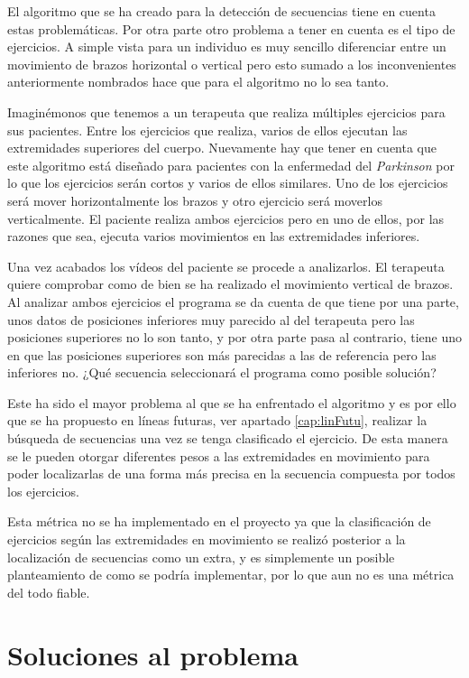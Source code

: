El algoritmo que se ha creado para la detección de secuencias tiene en cuenta estas problemáticas. Por otra parte otro problema a tener en cuenta es el tipo de ejercicios. A simple vista para un individuo es muy sencillo diferenciar entre un movimiento de brazos horizontal o vertical pero esto sumado a los inconvenientes anteriormente nombrados hace que para el algoritmo no lo sea tanto. 

Imaginémonos que tenemos a un terapeuta que realiza múltiples ejercicios para sus pacientes. Entre los ejercicios que realiza, varios de ellos ejecutan las extremidades superiores del cuerpo. Nuevamente hay que tener en cuenta que este algoritmo está diseñado para pacientes con la enfermedad del \textit{Parkinson} por lo que los ejercicios serán cortos y varios de ellos similares. Uno de los ejercicios será mover horizontalmente los brazos y otro ejercicio será moverlos verticalmente. El paciente realiza ambos ejercicios pero en uno de ellos, por las razones que sea, ejecuta varios movimientos en las extremidades inferiores.

Una vez acabados los vídeos del paciente se procede a analizarlos. El terapeuta quiere comprobar como de bien se ha realizado el movimiento vertical de brazos. Al analizar ambos ejercicios el programa se da cuenta de que tiene por una parte, unos datos de posiciones inferiores muy parecido al del terapeuta pero las posiciones superiores no lo son tanto, y por otra parte pasa al contrario, tiene uno en que las posiciones superiores son más parecidas a las de referencia pero las inferiores no. ¿Qué secuencia seleccionará el programa como posible solución?

Este ha sido el mayor problema al que se ha enfrentado el algoritmo y es por ello que se ha propuesto en líneas futuras, ver apartado \ref{cap:linFutu}, realizar la búsqueda de secuencias una vez se tenga clasificado el ejercicio. De esta manera se le pueden otorgar diferentes pesos a las extremidades en movimiento para poder localizarlas de una forma más precisa en la secuencia compuesta por todos los ejercicios. 

Esta métrica no se ha implementado en el proyecto ya que la clasificación de ejercicios según las extremidades en movimiento se realizó posterior a la localización de secuencias como un extra, y es simplemente un posible planteamiento de como se podría implementar, por lo que aun no es una métrica del todo fiable.


\section{Soluciones al problema}

